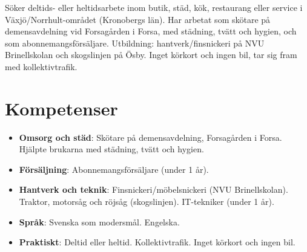\documentclass[11pt,a4paper,sans]{moderncv}
\begin{document}
\makecvtitle


\vspace{6pt}
\small{Söker deltids- eller heltidsarbete inom butik, städ, kök, restaurang eller service i Växjö/Norrhult-området (Kronobergs län). Har arbetat som skötare på demensavdelning vid Forsagården i Forsa, med städning, tvätt och hygien, och som abonnemangsförsäljare. Utbildning: hantverk/finsnickeri på NVU Brinellskolan och skogslinjen på Ösby. Inget körkort och ingen bil, tar sig fram med kollektivtrafik.}


\section{Kompetenser}
\vspace{1pt}
\begin{itemize}

\item \textbf{Omsorg och städ}: Skötare på demensavdelning, Forsagården i Forsa. Hjälpte brukarna med städning, tvätt och hygien.

\item \textbf{Försäljning}: Abonnemangsförsäljare (under 1 år).

\item \textbf{Hantverk och teknik}: Finsnickeri/möbelsnickeri (NVU Brinellskolan). Traktor, motorsåg och röjsåg (skogslinjen). IT-tekniker (under 1 år).

\item \textbf{Språk}: Svenska som modersmål. Engelska.

\item \textbf{Praktiskt}: Deltid eller heltid. Kollektivtrafik. Inget körkort och ingen bil.

\end{itemize}

\end{document}
